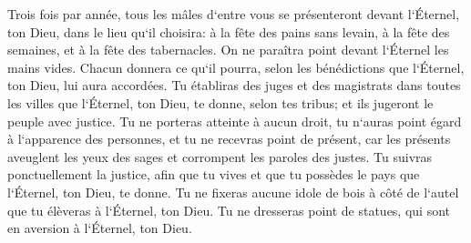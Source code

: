 \verse Trois fois par année, tous les mâles d`entre vous se présenteront devant l`Éternel, ton Dieu, dans le lieu qu`il choisira: à la fête des pains sans levain, à la fête des semaines, et à la fête des tabernacles. On ne paraîtra point devant l`Éternel les mains vides. 
\verse Chacun donnera ce qu`il pourra, selon les bénédictions que l`Éternel, ton Dieu, lui aura accordées. 
\verse Tu établiras des juges et des magistrats dans toutes les villes que l`Éternel, ton Dieu, te donne, selon tes tribus; et ils jugeront le peuple avec justice. 
\verse Tu ne porteras atteinte à aucun droit, tu n`auras point égard à l`apparence des personnes, et tu ne recevras point de présent, car les présents aveuglent les yeux des sages et corrompent les paroles des justes. 
\verse Tu suivras ponctuellement la justice, afin que tu vives et que tu possèdes le pays que l`Éternel, ton Dieu, te donne. 
\verse Tu ne fixeras aucune idole de bois à côté de l`autel que tu élèveras à l`Éternel, ton Dieu. 
\verse Tu ne dresseras point de statues, qui sont en aversion à l`Éternel, ton Dieu. 

\chapter{}

